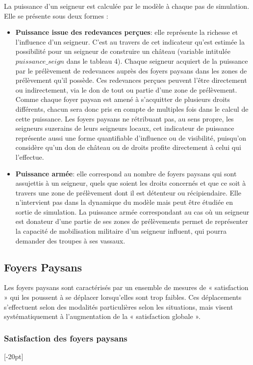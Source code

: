 La puissance d'un seigneur est calculée par le modèle à chaque pas de simulation.
Elle se présente sous deux formes :
\begin{itemize}
\item \textbf{Puissance issue des redevances perçues}: elle représente la richesse et l'influence d'un seigneur.
C'est au travers de cet indicateur qu'est estimée la possibilité pour un seigneur de construire un château (variable intitulée $puissance\_seign$ dans le tableau 4).
Chaque seigneur acquiert de la puissance par le prélèvement de redevances auprès des foyers paysans dans les zones de prélèvement qu'il possède.
Ces redevances perçues peuvent l'être directement ou indirectement, via le don de tout ou partie d'une zone de prélèvement.
Comme chaque foyer paysan est amené à s'acquitter de plusieurs droits différents, chacun sera donc pris en compte de multiples fois dans le calcul de cette puissance.
Les foyers paysans ne rétribuant pas, au sens propre, les seigneurs suzerains de leurs seigneurs locaux, cet indicateur de puissance représente aussi une forme quantifiable d'influence ou de visibilité, puisqu'on considère qu'un don de château ou de droits profite directement à celui qui l'effectue.

\item \textbf{Puissance armée}: elle correspond au nombre de foyers paysans qui sont assujettis à un seigneur, quels que soient les droits concernés et que ce soit à travers une zone de prélèvement dont il est détenteur ou récipiendaire.
Elle n'intervient pas dans la dynamique du modèle mais peut être étudiée en sortie de simulation.
La puissance armée correspondant au cas où un seigneur est donateur d'une partie de ses zones de prélèvements permet de représenter la capacité de mobilisation militaire d'un seigneur influent, qui pourra demander des troupes à ses vassaux.
\end{itemize}

\subsection{Foyers Paysans}

Les foyers paysans sont caractérisés par un ensemble de mesures de « satisfaction » qui les poussent à se déplacer lorsqu'elles sont trop faibles.
Ces déplacements s'effectuent selon des modalités particulières selon les situations, mais visent systématiquement à l'augmentation de la « satisfaction globale ».

\subsubsection{Satisfaction des foyers paysans}[-20pt]

